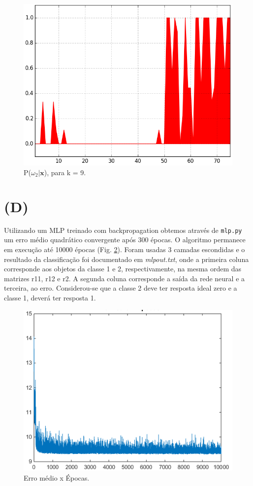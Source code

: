 \documentclass[12pt,twoside]{report}
\newcommand{\figureref}[1]{Fig. \ref{fig:#1}}
\newcommand{\captiontext}[1]{\small{#1}}
\newcommand{\code}[1]{\texttt{#1}}
\begin{document}
\begin{figure}[ht]
    \centering
    \includegraphics[scale=0.5]{k9-P2}
    \caption{\captiontext{P($\omega_2|\mathbf{x}$), para k = 9.}}
    \label{fig:k9-P2}
\end{figure}

\section*{(D)}

Utilizando um MLP treinado com backpropagation obtemos através de \code{mlp.py} um
erro médio quadrático convergente após 300 épocas. O algoritmo permanece em execução
até 10000 épocas (\figureref{mse_x_epochs}). Foram usadas 3 camadas escondidas e
o resultado da classificação foi documentado em \emph{mlpout.txt}, onde a primeira
coluna corresponde aos objetos da classe 1 e 2, respectivamente, na mesma ordem
das matrizes r11, r12 e r2. A segunda coluna corresponde a saída da rede neural
e a terceira, ao erro. Considerou-se que a classe 2 deve ter resposta ideal zero
e a classe 1, deverá ter resposta 1.

\begin{figure}[H]
    \centering
    \includegraphics[scale=0.6]{mse_x_epochs}
    \caption{\captiontext{Erro médio x Épocas.}}
    \label{fig:mse_x_epochs}
\end{figure}
\end{document}
